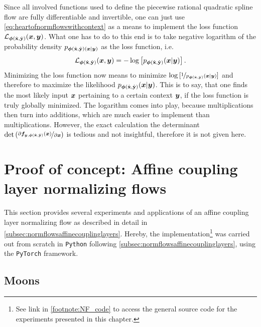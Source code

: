 \documentclass[a4paper,12pt]{report}
\begin{document}
Since all involved functions used to define the piecewise rational quadratic spline flow are fully differentiable and invertible, one can just use \cref{eq:heartofnormflowswithcontext} as a means to implement the loss function $\mathcal{L}_{\bm{\phi}(\hat{\boldsymbol{\mathbf{x}}},\hat{\boldsymbol{\mathbf{y}}})}(\bm{x},\bm{y})$. What one has to do to this end is to take negative logarithm of the probability density $p_{\bm{\phi}(\hat{\boldsymbol{\mathbf{x}}},\hat{\boldsymbol{\mathbf{y}}})(\bm{x}|\bm{y})}$ as the loss function, i.e. \begin{equation}
\mathcal{L}_{\bm{\phi}(\hat{\boldsymbol{\mathbf{x}}},\hat{\boldsymbol{\mathbf{y}}})}(\bm{x},\bm{y}) = -\log\left[p_{\bm{\phi}(\hat{\boldsymbol{\mathbf{x}}},\hat{\boldsymbol{\mathbf{y}}})}(\bm{x}|\bm{y})\right].
\end{equation} Minimizing the loss function now means to minimize $\log\left[\nicefrac{1 }{p_{\bm{\phi}(\hat{\boldsymbol{\mathbf{x}}},\hat{\boldsymbol{\mathbf{y}}})}(\bm{x}|\bm{y})}\right]$ and therefore to maximize the likelihood $p_{\bm{\phi}(\hat{\boldsymbol{\mathbf{x}}},\hat{\boldsymbol{\mathbf{y}}})}(\bm{x}|\bm{y})$. This is to say, that one finds the most likely input $\bm{x}$ pertaining to a certain context $\bm{y}$, if the loss function is truly globally minimized. The logarithm comes into play, because multiplications then turn into additions, which are much easier to implement than multiplications. However, the exact calculation the determinant $\det\left(\nicefrac{\partial \bm{f}_{\bm{y},\bm{\phi}(\hat{\boldsymbol{\mathbf{x}}},\hat{\boldsymbol{\mathbf{y}}})}(\bm{x})}{\partial \bm{x}}\right)$ is tedious and not insightful, therefore it is not given here.

\chapter{Proof of concept: Affine coupling layer normalizing flows}\label{chap:proofofconcept}
This section provides several experiments and applications of an affine coupling layer normalizing flow as described in detail in \cref{subsec:normflowsaffinecouplinglayers}. Hereby, the implementation\footnote{See link in \cref{footnote:NF_code} to access the general source code for the experiments presented in this chapter.} was carried out from scratch in \verb|Python| following \cref{subsec:normflowsaffinecouplinglayers}, using the \verb|PyTorch| framework.

\section{Moons}
\end{document}
